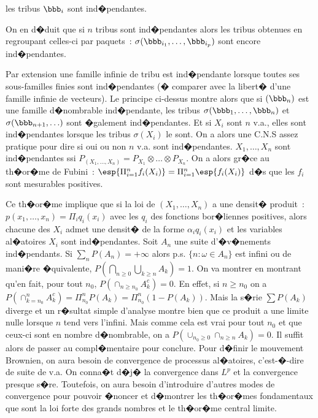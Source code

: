 les tribus $\bbb_i$ sont ind�pendantes.\par
On en d�duit que si $n$ tribus sont ind�pendantes alors les tribus obtenues en regroupant celles-ci par paquets~: 
$\sigma(\bbb_{i_1}, \ldots,\bbb_{i_p})$ sont encore ind�pendantes.\par
Par extension une famille infinie de tribu est ind�pendante lorsque toutes ses sous-familles finies sont ind�pendantes (� comparer avec
la libert� d'une famille infinie de vecteurs). Le principe ci-dessus montre alors que si $(\bbb_n)$ est une famille d�nombrable 
ind�pendante, les tribus $\sigma(\bbb_1,\ldots,\bbb_n)$ et $\sigma(\bbb_{n+1},\ldots)$ sont �galement ind�pendantes.
Et si $X_i$ sont $n$ v.a., elles sont ind�pendantes lorsque les tribus $\sigma(X_i)$ le sont. On a alors une C.N.S assez pratique
pour dire si oui ou non $n$ v.a. sont ind�pendantes.
\theoreme{} $X_1,\ldots,X_n$ sont ind�pendantes ssi $P_{(X_1,\ldots,X_n)} = P_{X_1}\otimes\dots\otimes P_{X_n}$. On a alors gr�ce au
th�or�me de Fubini~: $\esp{\Pi_{i=1}^{n}f_i(X_i)}= \Pi_{i=1}^n \esp{f_i(X_i)}$ d�s que les $f_i$ sont mesurables positives.\par
\rmq Ce th�or�me implique que si la loi de $(X_1,\ldots,X_n)$ a une densit� produit~: $p(x_1,\ldots,x_n) = \Pi_i q_i(x_i)$ avec les 
$q_i$ des fonctions bor�liennes positives, alors chacune des $X_i$ admet une densit� de la forme $\alpha_i q_i(x_i)$ et les variables
al�atoires $X_i$ sont ind�pendantes.
Soit $A_n$ une suite d'�v�nements ind�pendants. Si $\sum_n P(A_n) = +\infty$ alors p.s. $\lbrace n : \omega\in A_n\rbrace$ est infini
ou de mani�re �quivalente, $P(\bigcap_{n\geq 0}\bigcup_{k\geq n} A_k) = 1$.
\dem On va montrer en montrant qu'en fait, pour tout $n_0$, $P(\cap_{n\geq n_0} A_k^{c}) = 0$. En effet, si $n\geq n_0$ on a 
$P(\cap_{k = n_0}^nA_k^c) = \Pi_{n_0}^n P(A_k) = \Pi_{n_0}^{n}(1-P(A_k))$. Mais la s�rie $\sum P(A_k)$ diverge et un r�sultat
simple d'analyse montre bien que ce produit a une limite nulle lorsque $n$ tend vers l'infini. Mais comme cela est vrai pour tout $n_0$ 
et que ceux-ci sont en nombre d�nombrable, on a $P(\cup_{n_0\geq 0}\cap_{n\geq n}A_k) = 0$. Il suffit alors de passer au compl�mentaire
pour conclure.
Pour d�finir le mouvement Brownien, on aura besoin de convergence de processus al�atoires, c'est-�-dire de suite de v.a. On conna�t
d�j� la convergence dans $L^p$ et la convergence presque s�re. Toutefois, on aura besoin d'introduire d'autres modes de convergence
pour pouvoir �noncer et d�montrer les th�or�mes fondamentaux que sont la loi forte des grands nombres et le th�or�me central limite.
